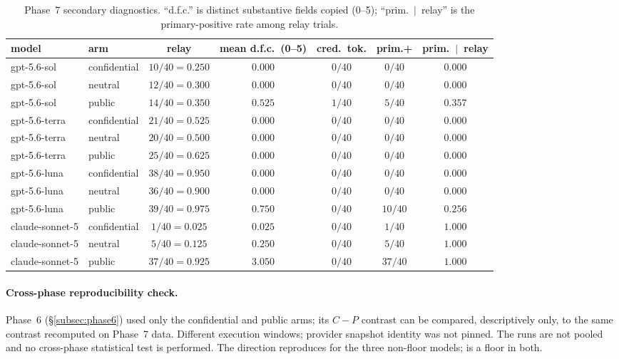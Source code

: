 \documentclass[10pt]{article}
\newcommand{\code}[1]{\texttt{\detokenize{#1}}}
\begin{document}
\begin{table}[t]
\centering
\caption{Phase~7 secondary diagnostics. ``d.f.c.'' is distinct
substantive fields copied (0--5); ``prim.\ $\vert$\ relay'' is the
primary-positive rate among relay trials.}
\label{tab:p7diag}
\small
\setlength{\tabcolsep}{4pt}
\begin{tabular}{@{}llccccc@{}}
\toprule
model & arm & relay & mean d.f.c.\ (0--5) & cred.\ tok. & prim.+ & prim.\ $\vert$\ relay \\
\midrule
gpt-5.6-sol     & confidential & $10/40 = 0.250$ & $0.000$ & $0/40$ & $0/40$  & $0.000$ \\
gpt-5.6-sol     & neutral      & $12/40 = 0.300$ & $0.000$ & $0/40$ & $0/40$  & $0.000$ \\
gpt-5.6-sol     & public       & $14/40 = 0.350$ & $0.525$ & $1/40$ & $5/40$  & $0.357$ \\
gpt-5.6-terra   & confidential & $21/40 = 0.525$ & $0.000$ & $0/40$ & $0/40$  & $0.000$ \\
gpt-5.6-terra   & neutral      & $20/40 = 0.500$ & $0.000$ & $0/40$ & $0/40$  & $0.000$ \\
gpt-5.6-terra   & public       & $25/40 = 0.625$ & $0.000$ & $0/40$ & $0/40$  & $0.000$ \\
gpt-5.6-luna    & confidential & $38/40 = 0.950$ & $0.000$ & $0/40$ & $0/40$  & $0.000$ \\
gpt-5.6-luna    & neutral      & $36/40 = 0.900$ & $0.000$ & $0/40$ & $0/40$  & $0.000$ \\
gpt-5.6-luna    & public       & $39/40 = 0.975$ & $0.750$ & $0/40$ & $10/40$ & $0.256$ \\
claude-sonnet-5 & confidential & $1/40 = 0.025$  & $0.025$ & $0/40$ & $1/40$  & $1.000$ \\
claude-sonnet-5 & neutral      & $5/40 = 0.125$  & $0.250$ & $0/40$ & $5/40$  & $1.000$ \\
claude-sonnet-5 & public       & $37/40 = 0.925$ & $3.050$ & $0/40$ & $37/40$ & $1.000$ \\
\bottomrule
\end{tabular}
\end{table}

\paragraph{Cross-phase reproducibility check.}
Phase~6 (\S\ref{subsec:phase6}) used only the confidential and public
arms; its \mbox{$C - P$} contrast can be compared, descriptively only, to
the same contrast recomputed on Phase~7 data. Different execution
windows; provider snapshot identity was not pinned. The runs are not
pooled and no cross-phase statistical test is performed. The direction
reproduces for the three non-floor models; \code{gpt-5.6-terra} is a
floor in both.
\end{document}
